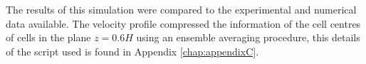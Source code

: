 \begin{refsection}
The results of this simulation were compared to the experimental and numerical data available. The velocity profile compressed the information of the cell centres of cells in the plane $z=0.6H$ using an ensemble averaging procedure, this details of the script used is found in Appendix \ref{chap:appendixC}.
\printbibliography[heading=subbibliography]
\end{refsection}
